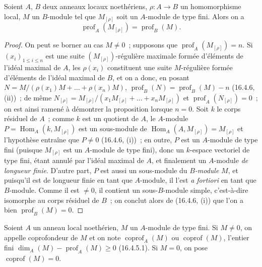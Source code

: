 \begin{proposition}[16.4.8]
\label{0.16.4.8-fr}
Soient $A$, $B$ deux anneaux locaux noethériens,
$\rho:A\to B$ un homomorphisme local, $M$ un $B$-module tel que
$M_{[\rho]}$ soit un $A$-module de type fini. Alors on a
\begin{equation}
\label{0.16.4.8.1-fr}
\tag{16.4.8.1}
  \operatorname{prof}_A(M_{[\rho]})=\operatorname{prof}_B(M).
\end{equation}
\end{proposition}

\begin{proof}
On peut se borner au cas $M\neq0$~; supposons que
$\operatorname{prof}_A(M_{[\rho]})=n$. Si $(x_i)_{1\leq i\leq n}$ est une
suite $(M_{[\rho]})$-régulière maximale formée d'éléments de l'idéal maximal
de $A$, les $\rho(x_i)$ constituent une suite $M$-régulière formée d'éléments
de l'idéal maximal de $B$, et on a donc, en posant
$N=M/(\rho(x_1)M+\ldots+\rho(x_n)M)$,
$\operatorname{prof}_B(N)=\operatorname{prof}_B(M)-n$ (16.4.6, (ii))~; de
même
$N_{[\rho]}=M_{[\rho]}/(x_1M_{[\rho]}+\ldots+x_nM_{[\rho]})$ et
$\operatorname{prof}_A(N_{[\rho]})=0$~; on est ainsi ramené à démontrer la
proposition lorsque $n=0$. Soit $k$ le corps résiduel de $A$~; comme $k$ est
un quotient de $A$, le $A$-module
$P=\operatorname{Hom}_A(k,M_{[\rho]})$ est un sous-module de
$\operatorname{Hom}_A(A,M_{[\rho]})=M_{[\rho]}$ et l'hypothèse entraîne que
$P\neq0$ (16.4.6, (i))~; en outre, $P$ est un $A$-module de type fini
(puisque $M_{[\rho]}$ est un $A$-module de type fini), donc un $k$-espace
vectoriel de type fini, étant annulé par l'idéal maximal de $A$, et finalement
un $A$-module \emph{de longueur finie}. D'autre part, $P$ est aussi un sous-module du
\emph{$B$-module} $M$, et puisqu'il est de longueur finie en tant que $A$-module, il
l'est \emph{a fortiori} en tant que $B$-module. Comme il est $\neq0$, il
contient un sous-$B$-module simple, c'est-à-dire isomorphe au corps résiduel de
$B$~; on conclut alors de (16.4.6, (i)) que l'on a bien
$\operatorname{prof}_B(M)=0$.
\end{proof}

\begin{definition}[16.4.9]
\label{0.16.4.9-fr}
Soient $A$ un anneau local noethérien, $M$ un $A$-module de type fini. Si
$M\neq0$, on appelle coprofondeur de $M$ et on note
$\operatorname{coprof}_A(M)$ ou $\operatorname{coprof}(M)$, l'entier fini
$\dim_A(M)-\operatorname{prof}_A(M)\geq0$ (16.4.5.1). Si $M=0$, on pose
$\operatorname{coprof}(M)=0$.
\end{definition}

